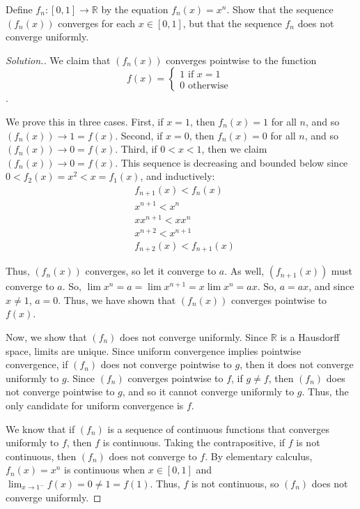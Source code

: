 \documentclass{article}
\newcommand{\R}{\mathbb{R}}
\newcommand{\sk}{\smallskip}
\begin{document}
\begin{enumerate}
    Define $f_n: [0, 1] \rightarrow \R$ by the equation $f_n(x) = x^n$. Show that the sequence $(f_n(x))$ converges for each $x \in [0, 1]$, but that the sequence $f_n$ does not converge uniformly. 

    \begin{proof}[Solution.]
    We claim that $(f_n(x))$ converges pointwise to the function $$f(x) = \begin{cases}
        1 \text{ if } x = 1 \\
        0 \text{ otherwise }
    \end{cases}$$.

    We prove this in three cases. First, if $x = 1$, then $f_n(x) = 1$ for all $n$, and so $(f_n(x)) \longrightarrow 1 = f(x)$. Second, if $x = 0$, then $f_n(x) = 0$ for all $n$, and so $(f_n(x)) \longrightarrow 0 = f(x)$. Third, if $0 < x < 1$, then we claim $(f_n(x)) \longrightarrow 0 = f(x)$. This sequence is  decreasing and bounded below since $0 < f_2(x) = x^2 < x = f_1(x)$, and inductively: 
    \begin{align*}
        & f_{n+1}(x) < f_n(x) \\
        & x^{n+1} < x^n \\
        & xx^{n+1} < xx^n \\
        & x^{n+2} < x^{n+1} \\
        & f_{n+2}(x) < f_{n+1}(x) 
    \end{align*}
    
    Thus, $(f_n(x))$ converges, so let it converge to $a$. As well, $(f_{n+1}(x))$ must converge to $a$. So, $\lim x^n = a = \lim x^{n+1} = x \lim x^n = ax$. So, $a = ax$, and since $x \neq 1$, $a = 0$. Thus, we have shown that $(f_n(x))$ converges pointwise to $f(x)$.

    \sk

    Now, we show that $(f_n)$ does not converge uniformly. Since $\R$ is a Hausdorff space, limits are unique. Since uniform convergence implies pointwise convergence, if $(f_n)$ does not converge pointwise to $g$, then it does not converge uniformly to $g$. Since $(f_n)$ converges pointwise to $f$, if $g \neq f$, then $(f_n)$ does not converge pointwise to $g$, and so it cannot converge uniformly to $g$. Thus, the only candidate for uniform convergence is $f$. 

    \sk
    
    We know that if $(f_n)$ is a sequence of continuous functions that converges uniformly to $f$, then $f$ is continuous. Taking the contrapositive, if $f$ is not continuous, then $(f_n)$ does not converge to $f$. By elementary calculus, $f_n(x) = x^n$ is continuous when $x \in [0, 1]$ and $\lim_{x \rightarrow 1^-} f(x) = 0 \neq 1 = f(1)$. Thus, $f$ is not continuous, so $(f_n)$ does not converge uniformly. 


\end{proof}
\end{enumerate}
\end{document}
